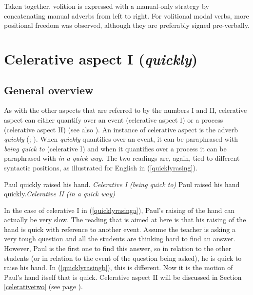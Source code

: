 \noindent Taken together, volition is expressed with a manual-only strategy by concatenating manual adverbs from left to right. For volitional modal verbs, more positional freedom was observed, although they are preferably signed pre-verbally.


\section{Celerative aspect I (\textit{quickly})}\label{celerativeone}
\subsection{General overview}
As with the other aspects that are referred to by the numbers I and II, celerative aspect can either quantify over an event (celerative aspect I) or a process (celerative aspect II) (see also \citealt{travis1988syntax, tennyl2000core, ernst2002syntax}). An instance of celerative aspect is the adverb \textit{quickly} (\citealt[292]{travis1988syntax}; \citealt[93]{cinque1999adverbs}). When \textit{quickly} quantifies over an event, it can be paraphrased with \textit{being quick to} (celerative I) and when it quantifies over a process it can be paraphrased with \textit{in a quick way}. The two readings are, again, tied to different syntactic positions, as illustrated for English in (\ref{quicklyrasing}).

\begin{exe}
\ex\label{quicklyrasing}\begin{xlist}
\ex Paul quickly raised his hand. \hfill{\textit{Celerative I (\textit{being quick to})}} \label{quicklyrasinga}
\ex Paul raised his hand quickly.\hfill{\textit{Celerative II (\textit{in a quick way})}} \label{quicklyrasingb}
\end{xlist}
\end{exe}  

\noindent In the case of celerative I in (\ref{quicklyrasinga}), Paul's raising of the hand can actually be very slow. The reading that is aimed at here is that his raising of the hand is quick with reference to another event. Assume the teacher is asking a very tough question and all the students are thinking hard to find an answer. However, Paul is the first one to find this answer, so in relation to the other students (or in relation to the event of the question being asked), he is quick to raise his hand. In (\ref{quicklyrasingb}), this is different. Now it is the motion of Paul's hand itself that is quick. Celerative aspect II will be discussed in Section \ref{celerativetwo} (see page \pageref{celerativetwo}).

